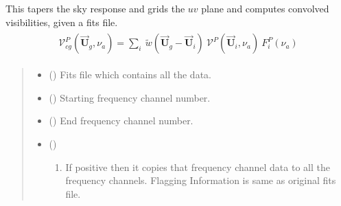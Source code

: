 \documentclass[a4paper,11pt,oneside,english,openany]{sphinxmanual}
\begin{document}

\begin{fulllineitems}
\label{\detokenize{grid:grid.grid}}
\pysigstartsignatures
{}
\pysigstopsignatures
\sphinxAtStartPar
This tapers the sky response and grids the \(uv\) plane and computes convolved visibilities, given a fits file.
\begin{equation*}
\begin{split}\begin{align}
\boxed{\mathcal{V}_{cg}^{P}(\vec{\textbf{U}}_g,\nu_a)=\sum_{i}\  \tilde{w}(\vec{\textbf{U}}_g - \vec{\textbf{U}}_i)\ \mathcal{V}^{P}(\vec{\textbf{U}}_i,\nu_a)\ F_i^{P}(\nu_a)}
\end{align}\end{split}
\end{equation*}\begin{quote}\begin{description}
\begin{itemize}
\item {} 
\sphinxAtStartPar
{} () \textendash{} Fits file  which contains all the data.

\item {} 
\sphinxAtStartPar
{} () \textendash{} Starting frequency channel number.

\item {} 
\sphinxAtStartPar
{} () \textendash{} End frequency channel number.

\item {} 
\sphinxAtStartPar
{} () \textendash{} \begin{enumerate}
%
\item {} 
\sphinxAtStartPar
If positive then it copies that frequency channel data to all the frequency channels. Flagging Information is same as original fits file.


\end{enumerate}
\end{itemize}
\end{description}
\end{quote}
\end{fulllineitems}
\end{document}
